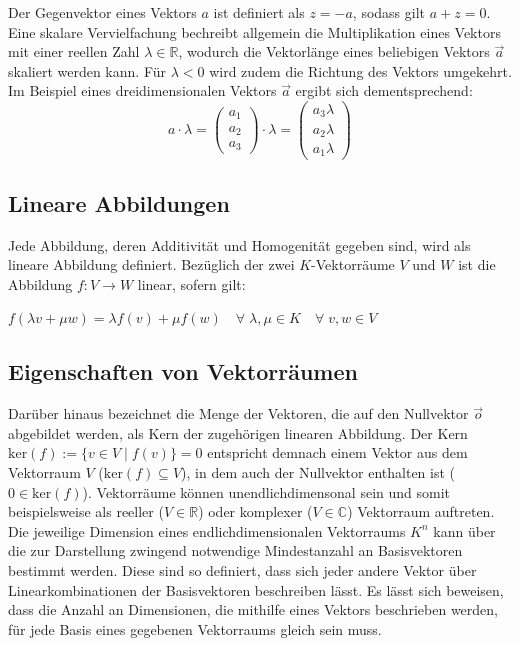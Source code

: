\documentclass[]{dsadokumentation}
\begin{document}
Der Gegenvektor eines Vektors $a$ ist definiert als $z = -a$, sodass gilt $a + z = 0$. Eine skalare Vervielfachung bechreibt allgemein die Multiplikation eines Vektors mit einer reellen Zahl $\lambda \in \mathbb{R}$, wodurch die Vektorlänge eines beliebigen Vektors $\vec{a}$ skaliert werden kann. Für $\lambda < 0$ wird zudem die Richtung des Vektors umgekehrt. Im Beispiel eines dreidimensionalen Vektors $\vec{a}$ ergibt sich dementsprechend:
\[ a \cdot \lambda = \left(\begin{array}{c} a_1 \\ a_2 \\ a_3 \end{array}\right)\cdot \lambda=\left(\begin{array}{c} a_3 \lambda \\ a_2 \lambda \\ a_1 \lambda \end{array}\right) \]

\subsection{Lineare Abbildungen}
Jede Abbildung, deren Additivität und Homogenität gegeben sind, wird als lineare Abbildung definiert. Bezüglich der zwei $K$-Vektorräume $V$ und $W$ ist die Abbildung $f: V \rightarrow W$ linear, sofern gilt:
\begin{center} $f(\lambda v + \mu w)=\lambda f(v) + \mu f(w) \quad \forall \; \lambda, \mu \in K \quad \forall \; v, w \in V$ \end{center}

\subsection{Eigenschaften von Vektorräumen}
Darüber hinaus bezeichnet die Menge der Vektoren, die auf den Nullvektor $\vec{o}$ abgebildet werden, als Kern der zugehörigen linearen Abbildung. Der Kern $\mathrm{ker}(f):= \{v \in V \; \big\vert \; f(v) \} = 0$ entspricht demnach einem Vektor aus dem Vektorraum $V$ ($\mathrm{ker}(f) \subseteq V$), in dem auch der Nullvektor enthalten ist ($0 \in \mathrm{ker}(f)$). Vektorräume können unendlichdimensonal sein und somit beispielsweise als reeller ($V \in \mathbb{R}$) oder komplexer ($V \in \mathbb{C}$) Vektorraum auftreten. Die jeweilige Dimension eines endlichdimensionalen Vektorraums $K^n$ kann über die zur Darstellung zwingend notwendige Mindestanzahl an Basisvektoren bestimmt werden. Diese sind so definiert, dass sich jeder andere Vektor über Linearkombinationen der Basisvektoren beschreiben lässt. Es lässt sich beweisen, dass die Anzahl an Dimensionen, die mithilfe eines Vektors beschrieben werden, für jede Basis eines gegebenen Vektorraums gleich sein muss.\\
\end{document}
